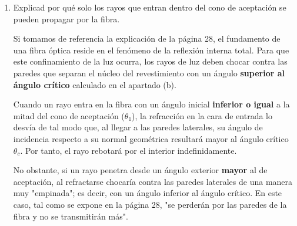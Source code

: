 \documentclass[11pt, a4paper]{article}
\newenvironment{problem}[1][Cuestión]{
	\vspace{0.5cm}
	\noindent{\Large\bfseries #1} \par\vspace{0.5cm}
}{
	\vspace{0.5cm}
}
\begin{document}
\begin{problem}[Problema]
\begin{enumerate}[label=\alph*)]
{					$$\text{NA}_{\text{nueva}} = \sin \theta_1 = \frac{\sqrt{1,48^2 - 1,46^2}}{1,33} = \frac{\sqrt{0,0588}}{1,33} \approx \frac{0,2425}{1,33} \approx 0,1823$$

					Para la nueva mitad del cono de aceptación $\theta_1$:

					$$\theta_1 = \arcsin(0,1823) \approx 10,50^\circ$$

					La nueva apertura numérica es $\boxed{0,182}$ y el nuevo semiángulo del cono de aceptación se reduce a $\boxed{10,50^\circ}$.
				}

			\item Explicad por qué solo los rayos que entran dentro del cono de aceptación se pueden propagar por la fibra.

				{ \color{blue} 
					Si tomamos de referencia la explicación de la página 28, el fundamento de una fibra óptica reside en el fenómeno de la reflexión interna total. Para que este confinamiento de la luz ocurra, los rayos de luz deben chocar contra las paredes que separan el núcleo del revestimiento con un ángulo \textbf{superior al ángulo crítico} calculado en el apartado (b).

					Cuando un rayo entra en la fibra con un ángulo inicial \textbf{inferior o igual} a la mitad del cono de aceptación ($\theta_1$), la refracción en la cara de entrada lo desvía de tal modo que, al llegar a las paredes laterales, su ángulo de incidencia respecto a su normal geométrica resultará mayor al ángulo crítico $\theta_c$. Por tanto, el rayo rebotará por el interior indefinidamente. 

					No obstante, si un rayo penetra desde un ángulo exterior \textbf{mayor} al de aceptación, al refractarse chocaría contra las paredes laterales de una manera muy "empinada"; es decir, con un ángulo inferior al ángulo crítico. En este caso, tal como se expone en la página 28, "se perderán por las paredes de la fibra y no se transmitirán más".
				}
		\end{enumerate}
	\end{problem}
\end{document}
